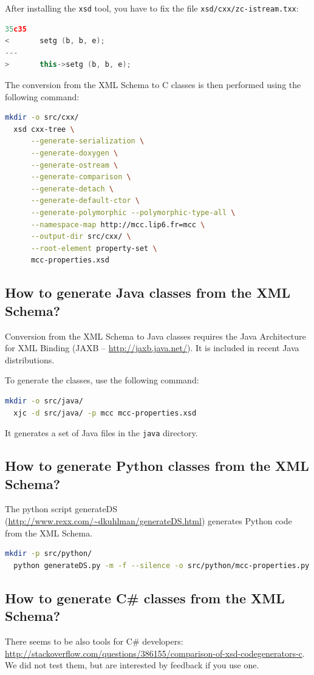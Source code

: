 \documentclass[10pt,english,a4paper]{article}
\newcommand{\CC}{%
  C\nolinebreak\hspace{-.05em}\raisebox{.4ex}{\scriptsize\bf +}\nolinebreak\hspace{-.10em}\raisebox{.4ex}{\scriptsize\bf +}%
}
\begin{document}
After installing the \lstinline!xsd! tool,
you have to fix the file \lstinline!xsd/cxx/zc-istream.txx!:
\begin{lstlisting}[language=C++]
35c35
<       setg (b, b, e);
---
>       this->setg (b, b, e);
\end{lstlisting}

The conversion from the XML Schema to \CC{} classes is then performed using the following command:
\begin{lstlisting}[language=sh]
  mkdir -o src/cxx/
  xsd cxx-tree \
      --generate-serialization \
      --generate-doxygen \
      --generate-ostream \
      --generate-comparison \
      --generate-detach \
      --generate-default-ctor \
      --generate-polymorphic --polymorphic-type-all \
      --namespace-map http://mcc.lip6.fr=mcc \
      --output-dir src/cxx/ \
      --root-element property-set \
      mcc-properties.xsd
\end{lstlisting}

\subsection{How to generate Java classes from the XML Schema?}
Conversion from the XML Schema to Java classes requires the Java Architecture for XML Binding
(JAXB -- \url{http://jaxb.java.net/}).
It is included in recent Java distributions.

To generate the classes, use the following command:
\begin{lstlisting}[language=sh]
  mkdir -o src/java/
  xjc -d src/java/ -p mcc mcc-properties.xsd
\end{lstlisting}
It generates a set of Java files in the \lstinline!java! directory.

\subsection{How to generate Python classes from the XML Schema?}
The python script generateDS (\url{http://www.rexx.com/~dkuhlman/generateDS.html}) generates Python code from the XML Schema.

\begin{lstlisting}[language=sh]
  mkdir -p src/python/
  python generateDS.py -m -f --silence -o src/python/mcc-properties.py mcc-properties.xsd
\end{lstlisting}

\subsection{How to generate C\# classes from the XML Schema?}
There seems to be also tools for C\# developers: \\
\url{http://stackoverflow.com/questions/386155/comparison-of-xsd-codegenerators-c}.
We did not test them, but are interested by feedback if you use one.
\end{document}
